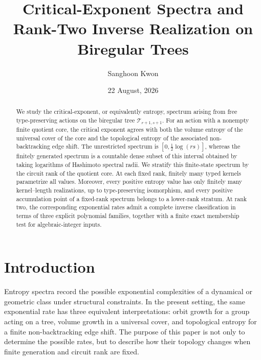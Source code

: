 \documentclass[11pt]{amsart}
\title[Critical-exponent spectra on biregular trees]
{Critical-Exponent Spectra and Rank-Two Inverse Realization
on Biregular Trees}
\author{Sanghoon Kwon}
\date{22 August, 2026}
\theoremstyle{plain}
\theoremstyle{definition}
\theoremstyle{remark}
\begin{document}
\raggedbottom

\begin{abstract}
We study the critical-exponent, or equivalently entropy, spectrum arising
from free type-preserving actions on the biregular tree
\(\mathcal T_{r+1,s+1}\).  For an action with a nonempty finite quotient
core, the critical exponent agrees with both the volume entropy of the
universal cover of the core and the topological entropy of the associated
non-backtracking edge shift.  The unrestricted spectrum is
\([0,\frac12\log(rs)]\), whereas the finitely generated spectrum is a
countable dense subset of this interval obtained by taking logarithms of
Hashimoto spectral radii.  We stratify this finite-state spectrum by the
circuit rank of the quotient core.  At each fixed rank, finitely many typed
kernels parametrize all values.  Moreover, every positive entropy value has
only finitely many kernel--length realizations, up to type-preserving
isomorphism, and every positive accumulation point of a fixed-rank spectrum
belongs to a lower-rank stratum.  At rank two, the corresponding exponential
rates admit a complete inverse classification in terms of three explicit
polynomial families, together with a finite exact membership test for
algebraic-integer inputs.
\end{abstract}


\maketitle
\enlargethispage{4pt}

\tableofcontents

\section{Introduction}

Entropy spectra record the possible exponential complexities of a dynamical
or geometric class under structural constraints.  In the present setting,
the same exponential rate has three equivalent interpretations: orbit growth
for a group acting on a tree, volume growth in a universal cover, and
topological entropy for a finite non-backtracking edge shift.  The purpose of
this paper is not only to determine the possible rates, but to describe how
their topology changes when finite generation and circuit rank are fixed.
\end{document}

